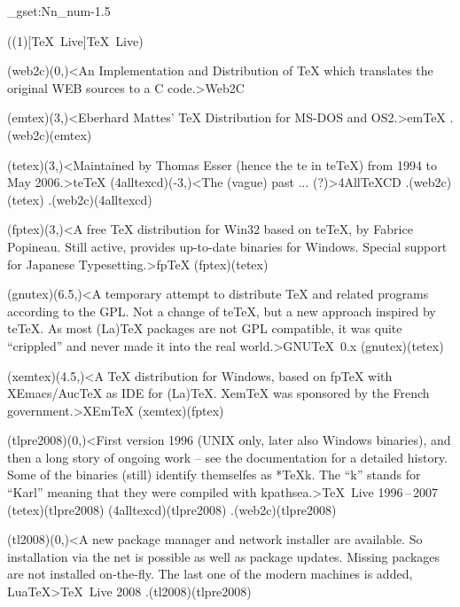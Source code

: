 \ExplSyntaxOn
\fp_gset:Nn\layerdist_num{-1.5}
\ExplSyntaxOff

\tograph(\tostruct(1)[\TeX\ Live]{\TeX\ Live}){
	\tonode(web2c)(0,\layer)<An Implementation and Distribution of TeX which translates the original WEB sources to a C code.>{Web2C}
	\steplayer

	\tonode[\histdistro](emtex)(3,\layer)<Eberhard Mattes' TeX Distribution for MS-DOS and OS2.>{em\TeX} %
	\todraw.(web2c)(emtex)
	\steplayer

	\tonode[\histdistro](tetex)(3,\layer)<Maintained by Thomas Esser (hence the te in teTeX) from 1994 to May 2006.>{te\TeX}
	\tonode[\histdistro](4alltexcd)(-3,\layer)<The (vague) past ... (?)>{4All\TeX CD }
	\todraw.(web2c)(tetex)
	\todraw.(web2c)(4alltexcd)
	\steplayer[-1.5]

	\tonode(fptex)(3,\layer)<A free TeX distribution for Win32 based on teTeX, by Fabrice Popineau. Still active, provides up-to-date binaries for Windows. Special support for Japanese Typesetting.>{fp\TeX}
	\todraw(fptex)(tetex)

	\tonode(gnutex)(6.5,\layer)<A temporary attempt to distribute TeX and related programs according to the GPL. Not a change of teTeX, but a new approach inspired by teTeX. As most (La)TeX packages are not GPL compatible, it was quite “crippled” and never made it into the real world.>{GNU\TeX\ 0.x}
	\todraw(gnutex)(tetex)

	\steplayer[-1.5]

	\tonode[\histdistro](xemtex)(4.5,\layer)<A TeX distribution for Windows, based on fpTeX with XEmacs/AucTeX as IDE for (La)TeX. XemTeX was sponsored by the French government.>{XEm\TeX}
	\todraw(xemtex)(fptex)

	\steplayer[-0.5]

	\tonode[\histdistro](tlpre2008)(0,\layer)<First version 1996 (UNIX only, later also Windows binaries), and then a long story of ongoing work – see the documentation for a detailed history. Some of the binaries (still) identify themselfes as *TeXk. The “k” stands for “Karl” meaning that they were compiled with kpathsea.>{\TeX\ Live 1996\,–\,2007}
	\todraw(tetex)(tlpre2008)
	\todraw(4alltexcd)(tlpre2008)
	\todraw.(web2c)(tlpre2008)
	\steplayer

	\tonode(tl2008)(0,\layer)<A new package manager and network installer are available. So installation via the net is possible as well as package updates. Missing packages are not installed on-the-fly. The last one of the modern machines is added, LuaTeX>{\TeX\ Live 2008}
	\todraw.(tl2008)(tlpre2008)

}
